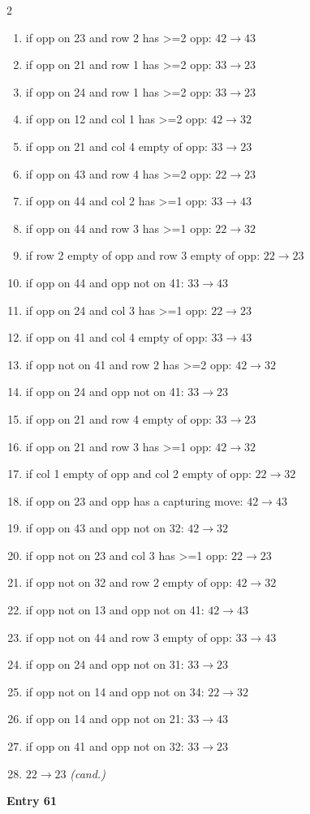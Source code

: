 \begin{multicols}{2}
\begin{tikzpicture}[scale=0.24]
\end{tikzpicture}
\nopagebreak\begin{enumerate}[topsep=1pt,itemsep=0pt,parsep=0pt,leftmargin=2.2em,label=\arabic*.]
\item if opp on 23 and row 2 has >=2 opp: $42\!\to\!43$
\item if opp on 21 and row 1 has >=2 opp: $33\!\to\!23$
\item if opp on 24 and row 1 has >=2 opp: $33\!\to\!23$
\item if opp on 12 and col 1 has >=2 opp: $42\!\to\!32$
\item if opp on 21 and col 4 empty of opp: $33\!\to\!23$
\item if opp on 43 and row 4 has >=2 opp: $22\!\to\!23$
\item if opp on 44 and col 2 has >=1 opp: $33\!\to\!43$
\item if opp on 44 and row 3 has >=1 opp: $22\!\to\!32$
\item if row 2 empty of opp and row 3 empty of opp: $22\!\to\!23$
\item if opp on 44 and opp not on 41: $33\!\to\!43$
\item if opp on 24 and col 3 has >=1 opp: $22\!\to\!23$
\item if opp on 41 and col 4 empty of opp: $33\!\to\!43$
\item if opp not on 41 and row 2 has >=2 opp: $42\!\to\!32$
\item if opp on 24 and opp not on 41: $33\!\to\!23$
\item if opp on 21 and row 4 empty of opp: $33\!\to\!23$
\item if opp on 21 and row 3 has >=1 opp: $42\!\to\!32$
\item if col 1 empty of opp and col 2 empty of opp: $22\!\to\!32$
\item if opp on 23 and opp has a capturing move: $42\!\to\!43$
\item if opp on 43 and opp not on 32: $42\!\to\!32$
\item if opp not on 23 and col 3 has >=1 opp: $22\!\to\!23$
\item if opp not on 32 and row 2 empty of opp: $42\!\to\!32$
\item if opp not on 13 and opp not on 41: $42\!\to\!43$
\item if opp not on 44 and row 3 empty of opp: $33\!\to\!43$
\item if opp on 24 and opp not on 31: $33\!\to\!23$
\item if opp not on 14 and opp not on 34: $22\!\to\!32$
\item if opp on 14 and opp not on 21: $33\!\to\!43$
\item if opp on 41 and opp not on 32: $33\!\to\!23$
\item $22\!\to\!23$ \hfill\textit{(cand.)}
\end{enumerate}\smallskip
\noindent\textbf{Entry 61} \; 
\end{multicols}
